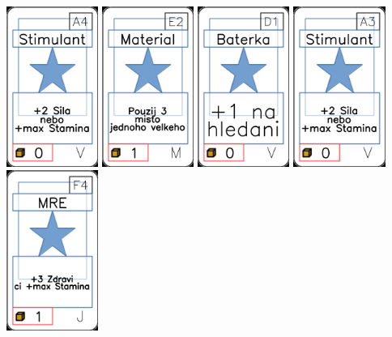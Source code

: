 \documentclass[a4paper]{article}
\begin{document}
	\includegraphics[width=3.0cm]{img-1_63}
	\includegraphics[width=3.0cm]{img-1_51}
	\includegraphics[width=3.0cm]{img-1_75}
	\includegraphics[width=3.0cm]{img-1_62}
	\includegraphics[width=3.0cm]{img-1_28}
\end{document}
